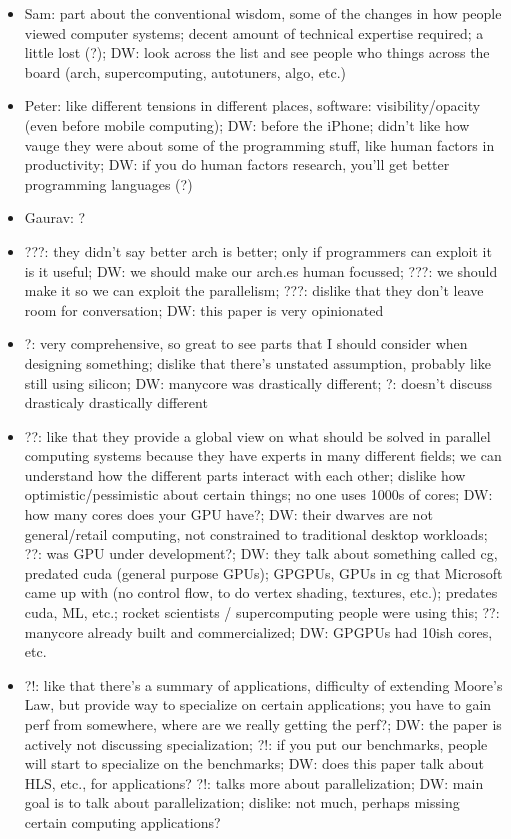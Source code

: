 \begin{itemize}
    \item Sam: part about the conventional wisdom, some of the changes in how people viewed computer systems; decent amount of technical expertise required; a little lost (?); DW: look across the list and see people who things across the board (arch, supercomputing, autotuners, algo, etc.)
    \item Peter: like different tensions in different places, software: visibility/opacity (even before mobile computing); DW: before the iPhone; didn't like how vauge they were about some of the programming stuff, like human factors in productivity; DW: if you do human factors research, you'll get better programming languages (?)
    \item Gaurav: ?
    \item ???: they didn't say better arch is better; only if programmers can exploit it is it useful; DW: we should make our arch.es human focussed; ???: we should make it so we can exploit the parallelism; ???: dislike that they don't leave room for conversation; DW: this paper is very opinionated
    \item ?: very comprehensive, so great to see parts that I should consider when designing something; dislike that there's unstated assumption, probably like still using silicon; DW: manycore was drastically different; ?: doesn't discuss drasticaly drastically different
    \item ??: like that they provide a global view on what should be solved in parallel computing systems because they have experts in many different fields; we can understand how the different parts interact with each other; dislike how optimistic/pessimistic about certain things; no one uses 1000s of cores; DW: how many cores does your GPU have?; DW: their dwarves are not general/retail computing, not constrained to traditional desktop workloads; ??: was GPU under development?; DW: they talk about something called cg, predated cuda (general purpose GPUs); GPGPUs, GPUs in cg that Microsoft came up with (no control flow, to do vertex shading, textures, etc.); predates cuda, ML, etc.; rocket scientists / supercomputing people were using this; ??: manycore already built and commercialized; DW: GPGPUs had 10ish cores, etc.
    \item ?!: like that there's a summary of applications, difficulty of extending Moore's Law, but provide way to specialize on certain applications; you have to gain perf from somewhere, where are we really getting the perf?; DW: the paper is actively not discussing specialization; ?!: if you put our benchmarks, people will start to specialize on the benchmarks; DW: does this paper talk about HLS, etc., for applications? ?!: talks more about parallelization; DW: main goal is to talk about parallelization; dislike: not much, perhaps missing certain computing applications?

\end{itemize}
